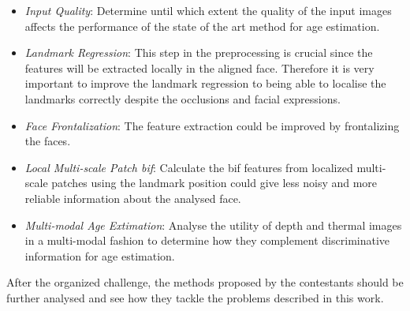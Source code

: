 \begin{itemize}
	\item \textit{Input Quality}: Determine until which extent the quality of the input images affects the performance of the state of the art method for age estimation.
	
	\item \textit{Landmark Regression}: This step in the preprocessing is crucial since the features will be extracted locally in the aligned face. Therefore it is very important to improve the landmark regression to being able to localise the landmarks correctly despite the occlusions and facial expressions.
	
	\item \textit{Face Frontalization}: The feature extraction could be improved by frontalizing the faces.
	
	\item \textit{Local Multi-scale Patch \gls{bif}}: Calculate the \gls{bif} features from localized multi-scale patches using the landmark position could give less noisy and more reliable information about the analysed face.
	
	\item \textit{Multi-modal Age Extimation}: Analyse the utility of depth and thermal images in a multi-modal fashion to determine how they complement discriminative information for age estimation.
\end{itemize}

After the organized challenge, the methods proposed by the contestants should be further analysed and see how they tackle the problems described in this work.


